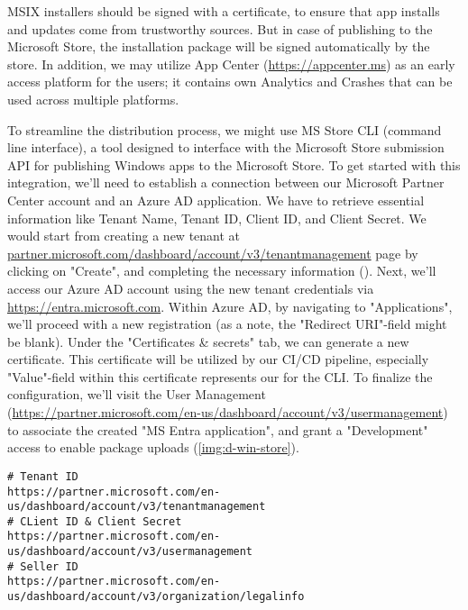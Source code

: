 \noindent MSIX installers should be signed with a certificate, to ensure that app installs and updates come from 
trustworthy sources. But in case of publishing to the Microsoft Store, the installation package will be signed 
automatically by the store. In addition, we may utilize App Center (\href{https://appcenter.ms}{https://appcenter.ms}) 
as an early access platform for the users; it contains own Analytics and Crashes that can be used across multiple 
platforms.

To streamline the distribution process, we might use MS Store CLI (command line interface), a tool designed to 
interface with the Microsoft Store submission API for publishing Windows apps to the Microsoft Store. To get started 
with this integration, we'll need to establish a connection between our Microsoft Partner Center account and an Azure 
AD application. We have to retrieve essential information like Tenant Name, Tenant ID, Client ID, and Client Secret. 
We would start from creating a new tenant at 
\href{https://partner.microsoft.com/en-us/dashboard/account/v3/tenantmanagement}{partner.microsoft.com/dashboard/account/v3/tenantmanagement}
page by clicking on "Create", and completing the necessary information (). Next, we'll access our Azure AD 
account using the new tenant credentials via \href{https://entra.microsoft.com}{https://entra.microsoft.com}. Within 
Azure AD, by navigating to "Applications", we'll proceed with a new registration (as a note, the "Redirect URI"-field 
might be blank). Under the "Certificates \& secrets" tab, we can generate a new certificate. This certificate will be 
utilized by our CI/CD pipeline, especially "Value"-field within this certificate represents our  for 
the CLI. To finalize the configuration, we'll visit the User Management 
(\href{https://partner.microsoft.com/en-us/dashboard/account/v3/usermanagement}{https://partner.microsoft.com/en-us/dashboard/account/v3/usermanagement})
to associate the created "MS Entra application", and grant a "Development" access to enable package uploads 
(\cref{img:d-win-store}).

\begin{lstlisting}[language=terminal]
# Tenant ID  
https://partner.microsoft.com/en-us/dashboard/account/v3/tenantmanagement
# CLient ID & Client Secret
https://partner.microsoft.com/en-us/dashboard/account/v3/usermanagement
# Seller ID 
https://partner.microsoft.com/en-us/dashboard/account/v3/organization/legalinfo
\end{lstlisting}

